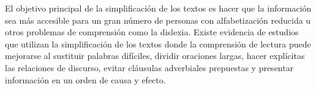 \documentclass[11pt]{exam}
\begin{document}
\begin{questions}
El objetivo principal de la simplificación de los textos es hacer que la información sea más accesible para un gran número de personas con alfabetización reducida u otros problemas de comprensión como la dislexia. Existe evidencia de estudios que utilizan la simplificación de los textos donde la comprensión de lectura puede mejorarse al sustituir palabras difíciles, dividir oraciones largas, hacer explícitas las relaciones de discurso, evitar cláusulas adverbiales prepuestas y presentar información en un orden de causa y efecto. 

\end{questions}
	
\end{document}
